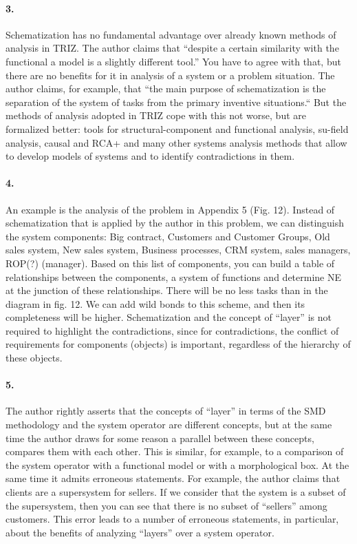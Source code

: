 \paragraph{3.}
Schematization has no fundamental advantage over already known methods of
analysis in TRIZ. The author claims that “despite a certain similarity with
the functional a model is a slightly different tool.” You have to agree with
that, but there are no benefits for it in analysis of a system or a problem
situation. The author claims, for example, that “the main purpose of
schematization is the separation of the system of tasks from the primary
inventive situations.“ But the methods of analysis adopted in TRIZ cope with
this not worse, but are formalized better: tools for structural-component and
functional analysis, su-field analysis, causal and RCA+ and many other systems
analysis methods that allow to develop models of systems and to identify
contradictions in them.

\paragraph{4.}
An example is the analysis of the problem in Appendix 5 (Fig. 12). Instead of
schematization that is applied by the author in this problem, we can
distinguish the system components: Big contract, Customers and Customer
Groups, Old sales system, New sales system, Business processes, CRM system,
sales managers, ROP(?) (manager). Based on this list of components, you can
build a table of relationships between the components, a system of functions
and determine NE at the junction of these relationships. There will be no less
tasks than in the diagram in fig. 12. We can add wild bonds to this scheme,
and then its completeness will be higher. Schematization and the concept of
“layer” is not required to highlight the contradictions, since for
contradictions, the conflict of requirements for components (objects) is
important, regardless of the hierarchy of these objects.

\paragraph{5.}
The author rightly asserts that the concepts of “layer” in terms of the SMD
methodology and the system operator are different concepts, but at the same
time the author draws for some reason a parallel between these concepts,
compares them with each other. This is similar, for example, to a comparison
of the system operator with a functional model or with a morphological box. At
the same time it admits erroneous statements. For example, the author claims
that clients are a supersystem for sellers. If we consider that the system is
a subset of the supersystem, then you can see that there is no subset of
“sellers” among customers. This error leads to a number of erroneous
statements, in particular, about the benefits of analyzing “layers” over a
system operator.


